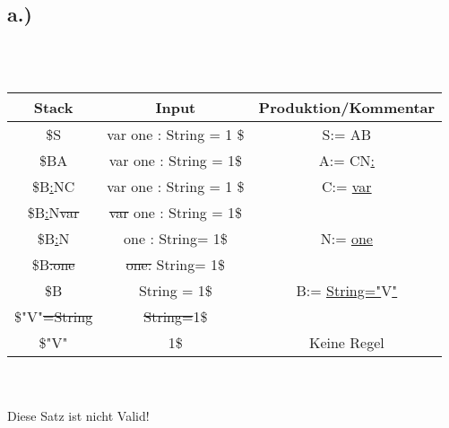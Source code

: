 \documentclass[12pt,runningheads,a4paper]{llncs}
\begin{document}
\subsection*{a.)}
\\
\\
\begin{tabular}{  |c|c|c|  }
 \hline
 Stack&Input &Produktion/Kommentar\\ 
 \hline
 \$S &var one : String = 1 \$ &S:= AB \\
  \hline
 \$BA &var one : String = 1\$ &A:= CN\underline{:}\\
 \hline
 \$B\underline{:}NC &var one : String = 1 \$ &C:= \underline{var}\\
 \hline
 \$B\underline{:}N\st{var} &\st{var} one : String = 1\$ &\\
   \hline
 \$B\underline{:}N &one : String= 1\$ &N:= \underline{one} \\
   \hline
 \$B\st{:}\st{one} &\st{one}\st{:} String= 1\$ & \\
   \hline
 \$B & String = 1\$ & B:= \underline{String}\underline{=}\underline{"}V\underline{"} \\
   \hline
 \$"V"\st{=}\st{String} &\st{String}\st{=}1\$ & \\
   \hline
 \$"V" &1\$ & Keine Regel \\
   \hline
 
 \end{tabular}\\
 \\
 Diese Satz ist nicht Valid!
 \\
\end{document}
